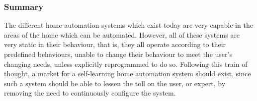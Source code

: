 \subsubsection{Summary}
The different home automation systems which exist today are very capable in the areas of the home which can be automated. However, all of these systems are very static in their behaviour, that is, they all operate according to their predefined behaviours, unable to change their behaviour to meet the user's changing needs, unless explicitly reprogrammed to do so. Following this train of thought, a market for a self-learning home automation system should exist, since such a system should be able to lessen the toll on the user, or expert, by removing the need to continuously configure the system.

